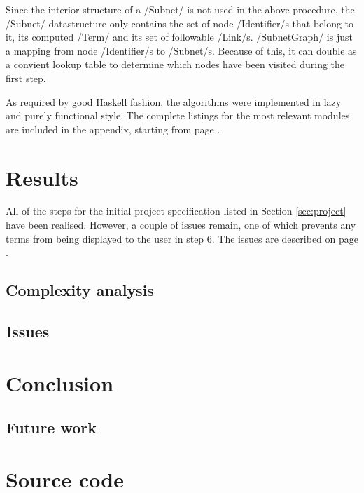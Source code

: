 \documentclass[12pt,a4paper]{article}
\begin{document}
Since the interior structure of a \hs/Subnet/ is not used in the above procedure, the \hs/Subnet/ datastructure only contains the set of node \hs/Identifier/s that belong to it, its computed \hs/Term/ and its set of followable \hs/Link/s. \hs/SubnetGraph/ is just a mapping from node \hs/Identifier/s to \hs/Subnet/s. Because of this, it can double as a convient lookup table to determine which nodes have been visited during the first step.

As required by good Haskell fashion, the algorithms were implemented in lazy and purely functional style. The complete listings for the most relevant modules are included in the appendix, starting from page \pageref{code}.


\section{Results}

All of the steps for the initial project specification listed in Section \ref{sec:project} have been realised. However, a couple of issues remain, one of which prevents any terms from being displayed to the user in step 6. The issues are described on page \pageref{sub:issues}.

\subsection{Complexity analysis}

\subsection{Issues}\label{sub:issues}

\section{Conclusion}

\subsection{Future work}


\begin{thebibliography}{9}
\end{thebibliography}


\appendix

\section{Source code}\label{code}
\end{document}
